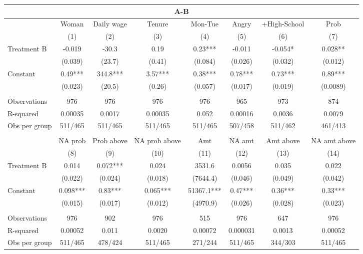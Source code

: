 \begin{tabular}{lccccccc}
\toprule
\multicolumn{8}{c}{A-B} \\
\midrule
\midrule
      & Woman  & Daily wage & Tenure & Mon-Tue & Angry & +High-School & Prob \\
\midrule
\midrule
      & (1)   & (2)   & (3)   & (4)   & (5)   & (6)   & (7) \\
\midrule
Treatment B & -0.019 & -30.3 & 0.19  & 0.23*** & -0.011 & -0.054* & 0.028** \\
      & (0.039) & (23.7) & (0.41) & (0.084) & (0.026) & (0.032) & (0.012) \\
Constant  & 0.49*** & 344.8*** & 3.57*** & 0.38*** & 0.78*** & 0.73*** & 0.89*** \\
      & (0.023) & (20.5) & (0.26) & (0.057) & (0.017) & (0.019) & (0.0089) \\
      &       &       &       &       &       &       &  \\
\midrule
Observations & 976   & 976   & 976   & 976   & 965   & 973   & 874 \\
R-squared & 0.00035 & 0.0017 & 0.00035 & 0.052 & 0.00016 & 0.0036 & 0.0079 \\
Obs per group & 511/465 & 511/465 & 511/465 & 511/465 & 507/458 & 511/462 & 461/413 \\
\midrule
\midrule
      &       &       &       &       &       &       &  \\
      & NA prob & Prob above & NA prob above & Amt   & NA amt & Amt above & NA amt above \\
\midrule
\midrule
      & (8)   & (9)   & (10)  & (11)  & (12)  & (13)  & (14) \\
\cmidrule{2-8}Treatment B & 0.014 & 0.072*** & 0.024 & 3531.6 & 0.0056 & 0.035 & 0.022 \\
      & (0.022) & (0.024) & (0.018) & (7644.4) & (0.046) & (0.049) & (0.042) \\
Constant  & 0.098*** & 0.83*** & 0.065*** & 51367.1*** & 0.47*** & 0.36*** & 0.33*** \\
      & (0.015) & (0.017) & (0.012) & (4970.9) & (0.026) & (0.028) & (0.023) \\
      &       &       &       &       &       &       &  \\
\midrule
Observations & 976   & 902   & 976   & 515   & 976   & 647   & 976 \\
R-squared & 0.00052 & 0.011 & 0.0020 & 0.00072 & 0.000031 & 0.0013 & 0.00052 \\
Obs per group & 511/465 & 478/424 & 511/465 & 271/244 & 511/465 & 344/303 & 511/465 \\
\bottomrule
\bottomrule
\end{tabular}%

